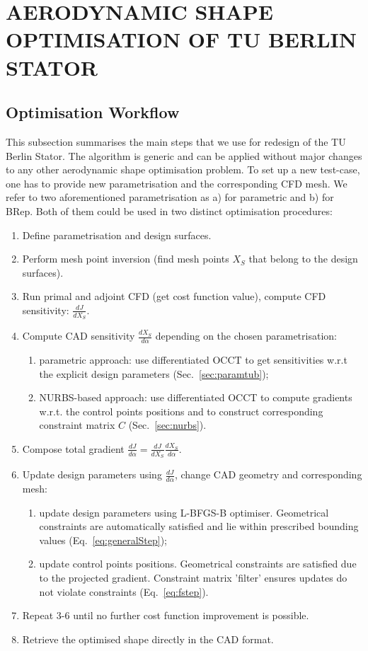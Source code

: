 \documentclass[9pt,academicons]{article}
\begin{document}
\section{AERODYNAMIC SHAPE OPTIMISATION OF TU BERLIN STATOR}
\label{sec:results}

\subsection{Optimisation Workflow}
This subsection summarises the main steps that we use for redesign of the TU Berlin Stator. The algorithm is generic and can be applied without major changes to any other aerodynamic shape optimisation problem. To set up a new test-case, one has to provide new parametrisation and the corresponding CFD mesh. We refer to two aforementioned parametrisation as a) for parametric and b) for BRep. Both of them could be used in two distinct optimisation procedures: 
\begin{enumerate}
\item Define parametrisation and design surfaces.
\item Perform mesh point inversion (find mesh points $X_S$ that belong to the design surfaces).
\item Run primal and adjoint CFD (get cost function value), compute CFD sensitivity: $\frac{dJ}{dX_S}$.
\item Compute CAD sensitivity $\frac{dX_S}{d\alpha}$ depending on the chosen parametrisation:
\begin{enumerate}[label*=\alph*)]
\item parametric approach: use differentiated OCCT to get sensitivities w.r.t the explicit design parameters (Sec.~\ref{sec:paramtub});
\item NURBS-based approach: use differentiated OCCT to compute gradients w.r.t. the control points positions and to construct corresponding constraint matrix $C$ (Sec.~\ref{sec:nurbs}).
\end{enumerate}
\item Compose total gradient $\frac{dJ}{d\alpha} = \frac{dJ}{dX_S} \frac{dX_S}{d\alpha}$.
\item Update design parameters using  $\frac{dJ}{d\alpha}$, change CAD geometry and corresponding mesh:
\begin{enumerate}[label*=\alph*)]
\item update design parameters using L-BFGS-B optimiser. Geometrical constraints are automatically satisfied and lie within prescribed bounding values (Eq.~\ref{eq:generalStep});
\item update control points positions. Geometrical constraints are satisfied due to the projected gradient. Constraint matrix 'filter' ensures updates do not violate constraints (Eq.~\ref{eq:fstep}). 
\end{enumerate}
\item Repeat 3-6 until no further cost function improvement is possible.
\item Retrieve the optimised shape directly in the CAD format.
\end{enumerate}
\end{document}
